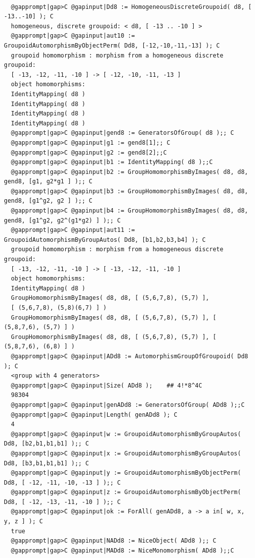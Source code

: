 \documentclass[a4paper,11pt]{report}
\begin{document}
{{{ }

 
\begin{Verbatim}[commandchars=@|C,fontsize=\small,frame=single,label=Example]
  
  @gapprompt|gap>C @gapinput|Dd8 := HomogeneousDiscreteGroupoid( d8, [ -13..-10] ); C
  homogeneous, discrete groupoid: < d8, [ -13 .. -10 ] >
  @gapprompt|gap>C @gapinput|aut10 := GroupoidAutomorphismByObjectPerm( Dd8, [-12,-10,-11,-13] ); C
  groupoid homomorphism : morphism from a homogeneous discrete groupoid:
  [ -13, -12, -11, -10 ] -> [ -12, -10, -11, -13 ]
  object homomorphisms:
  IdentityMapping( d8 )
  IdentityMapping( d8 )
  IdentityMapping( d8 )
  IdentityMapping( d8 )
  @gapprompt|gap>C @gapinput|gend8 := GeneratorsOfGroup( d8 );; C
  @gapprompt|gap>C @gapinput|g1 := gend8[1];; C
  @gapprompt|gap>C @gapinput|g2 := gend8[2];;C
  @gapprompt|gap>C @gapinput|b1 := IdentityMapping( d8 );;C
  @gapprompt|gap>C @gapinput|b2 := GroupHomomorphismByImages( d8, d8, gend8, [g1, g2*g1 ] );; C
  @gapprompt|gap>C @gapinput|b3 := GroupHomomorphismByImages( d8, d8, gend8, [g1^g2, g2 ] );; C
  @gapprompt|gap>C @gapinput|b4 := GroupHomomorphismByImages( d8, d8, gend8, [g1^g2, g2^(g1*g2) ] );; C
  @gapprompt|gap>C @gapinput|aut11 := GroupoidAutomorphismByGroupAutos( Dd8, [b1,b2,b3,b4] ); C
  groupoid homomorphism : morphism from a homogeneous discrete groupoid:
  [ -13, -12, -11, -10 ] -> [ -13, -12, -11, -10 ]
  object homomorphisms:
  IdentityMapping( d8 )
  GroupHomomorphismByImages( d8, d8, [ (5,6,7,8), (5,7) ], 
  [ (5,6,7,8), (5,8)(6,7) ] )
  GroupHomomorphismByImages( d8, d8, [ (5,6,7,8), (5,7) ], [ (5,8,7,6), (5,7) ] )
  GroupHomomorphismByImages( d8, d8, [ (5,6,7,8), (5,7) ], [ (5,8,7,6), (6,8) ] )
  @gapprompt|gap>C @gapinput|ADd8 := AutomorphismGroupOfGroupoid( Dd8 ); C
  <group with 4 generators>
  @gapprompt|gap>C @gapinput|Size( ADd8 );    ## 4!*8^4C
  98304
  @gapprompt|gap>C @gapinput|genADd8 := GeneratorsOfGroup( ADd8 );;C
  @gapprompt|gap>C @gapinput|Length( genADd8 ); C
  4  
  @gapprompt|gap>C @gapinput|w := GroupoidAutomorphismByGroupAutos( Dd8, [b2,b1,b1,b1] );; C
  @gapprompt|gap>C @gapinput|x := GroupoidAutomorphismByGroupAutos( Dd8, [b3,b1,b1,b1] );; C
  @gapprompt|gap>C @gapinput|y := GroupoidAutomorphismByObjectPerm( Dd8, [ -12, -11, -10, -13 ] );; C
  @gapprompt|gap>C @gapinput|z := GroupoidAutomorphismByObjectPerm( Dd8, [ -12, -13, -11, -10 ] );; C
  @gapprompt|gap>C @gapinput|ok := ForAll( genADd8, a -> a in[ w, x, y, z ] ); C
  true
  @gapprompt|gap>C @gapinput|NADd8 := NiceObject( ADd8 );; C
  @gapprompt|gap>C @gapinput|MADd8 := NiceMonomorphism( ADd8 );;C

\end{Verbatim}}}
\end{document}

